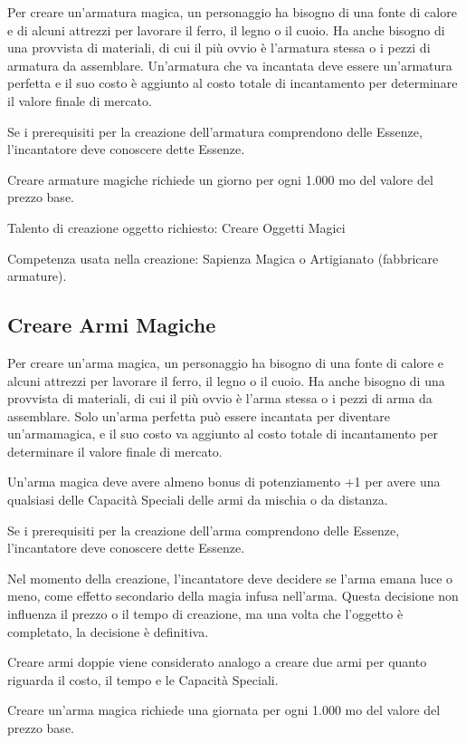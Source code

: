\documentclass[a4paper,11pt,twoside,openany]{book}
\begin{document}
Per creare un'armatura magica, un personaggio ha bisogno di una fonte di calore e di alcuni attrezzi per lavorare il ferro, il legno o il cuoio. Ha anche bisogno di una provvista di materiali, di cui il più ovvio è l'armatura stessa o i pezzi di armatura da assemblare. Un'armatura che va incantata deve essere un'armatura perfetta e il suo costo è aggiunto al costo totale di incantamento per determinare il valore finale di mercato.

Se i prerequisiti per la creazione dell'armatura comprendono delle Essenze, l'incantatore deve conoscere dette Essenze.

Creare armature magiche richiede un giorno per ogni 1.000 mo del valore
del prezzo base.

Talento di creazione oggetto richiesto: Creare Oggetti Magici

Competenza usata nella creazione: Sapienza Magica o Artigianato (fabbricare armature).

\subsection{Creare Armi Magiche}

Per creare un'arma magica, un personaggio ha bisogno di una fonte di calore e alcuni attrezzi per lavorare il ferro, il legno o il cuoio. Ha anche bisogno di una provvista di materiali, di cui il più ovvio è l'arma stessa o i pezzi di arma da assemblare. Solo un'arma perfetta può essere incantata per diventare un'armamagica, e il suo costo va aggiunto al costo totale di incantamento per determinare il valore finale di mercato.

Un'arma magica deve avere almeno bonus di potenziamento +1 per avere una qualsiasi delle Capacità Speciali delle armi da mischia o da distanza.

Se i prerequisiti per la creazione dell'arma comprendono delle Essenze, l'incantatore deve conoscere dette Essenze.

Nel momento della creazione, l'incantatore deve decidere se l'arma emana luce o meno, come effetto secondario della magia infusa nell'arma. Questa decisione non influenza il prezzo o il tempo di creazione, ma una volta che l'oggetto è completato, la decisione è definitiva.

Creare armi doppie viene considerato analogo a creare due armi per quanto riguarda il costo, il tempo e le Capacità Speciali.

Creare un'arma magica richiede una giornata per ogni 1.000 mo del valore del prezzo base.
\end{document}
